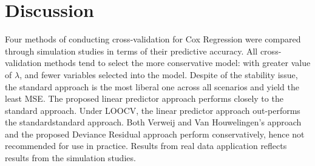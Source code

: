 \section{Discussion}

\par Four methods of conducting cross-validation for Cox Regression were compared through simulation studies in terms of their predictive accuracy. All cross-validation methods tend to select the more conservative model: with greater value of $\lambda$, and fewer variables selected into the model. Despite of the stability issue, the standard approach is the most liberal one across all scenarios and yield the least MSE. The proposed linear predictor approach performs closely to the standard approach. Under LOOCV, the linear predictor approach out-performs the standardstandard approach. Both Verweij and Van Houwelingen's approach and the proposed Deviance Residual approach perform conservatively, hence not recommended for use in practice. Results from real data application reflects results from the simulation studies.




